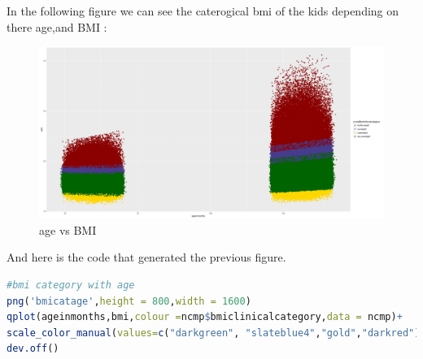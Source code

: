 \documentclass{article}
\begin{document}
In the following figure we can see the caterogical bmi of the kids depending on there age,and BMI : 
\begin{figure}[H]
	\begin{center}
		\includegraphics[scale=0.3]{bmicatage.PNG}
	\end{center}
	\caption{age vs BMI}
\end{figure}
And here is the code that generated the previous figure.
\begin{lstlisting}[language=R]
#bmi category with age
png('bmicatage',height = 800,width = 1600)
qplot(ageinmonths,bmi,colour =ncmp$bmiclinicalcategory,data = ncmp)+
scale_color_manual(values=c("darkgreen", "slateblue4","gold","darkred"))
dev.off()
\end{lstlisting}
\end{document}
